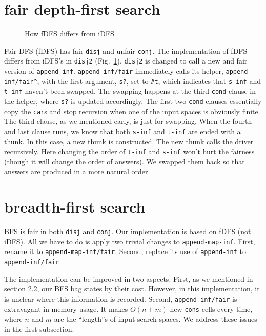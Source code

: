 \documentclass[format=acmlarge, review=true, authordraft=true]{acmart}
\newcommand{\conj}{\texttt{conj}}
\newcommand{\disj}{\texttt{disj}}
\begin{document}
\section{fair depth-first search}

\begin{figure}
	
	\caption{How fDFS differs from iDFS}
	\label{fDFS}
\end{figure}

Fair DFS (fDFS) has fair \disj{} and unfair \conj{}. The implementation of fDFS 
differs from iDFS's in \texttt{disj2} (Fig.~\ref{fDFS}). \texttt{disj2} is 
changed to call a new and fair version of \texttt{append-inf}. 
\texttt{append-inf/fair} immediately calls its helper, 
\texttt{append-inf/fair\^{}}, with the first argument, \texttt{s?}, set to 
\texttt{\#{}t}, which indicates that \texttt{s-inf} and \texttt{t-inf} haven't 
been swapped. The swapping happens at the third \texttt{cond} clause in the 
helper, where \texttt{s?} is updated accordingly. The first two \texttt{cond} 
clauses essentially copy the \texttt{car}s and stop recursion when one of the 
input spaces is obviously finite. The third clause, as we mentioned early, is 
just for swapping. When the fourth and last clause runs, we know that both 
\texttt{s-inf} and \texttt{t-inf} are ended with a thunk. In this case, a new 
thunk is constructed. The new thunk calls the driver recursively. Here changing 
the order of \texttt{t-inf} and \texttt{s-inf} won't hurt the fairness (though 
it will change the order of answers). We swapped them back so that answers are 
produced in a more natural order.


\section{breadth-first search}

BFS is fair in both \disj{} and \conj{}. Our implementation is based on 
fDFS (not iDFS). All we have to do is apply two trivial changes to 
\texttt{append-map-inf}. First, rename it to \texttt{append-map-inf/fair}. 
Second, replace its use of \texttt{append-inf} to \texttt{append-inf/fair}. 

The implementation can be improved in two aspects. First, as we mentioned in 
section 2.2, our BFS bag states by their cost. However, in this implementation, 
it is unclear where this information is recorded. Second, 
\texttt{append-inf/fair} is extravagant in memory usage. It makes 
$O(n+m)$ new \texttt{cons} cells every time, where $n$ and $m$ are the 
``length''s of input search spaces. We address these issues in the first 
subsection.
\end{document}

